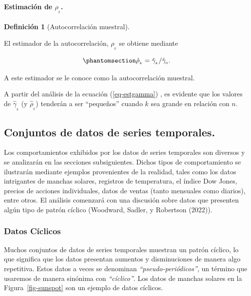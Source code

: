 \documentclass[
  us-letterpaper,
]{scrreprt}
\let\oldparagraph\paragraph
\renewcommand{\paragraph}[1]{\oldparagraph{#1}\mbox{}}
\theoremstyle{plain}
\theoremstyle{definition}
\newtheorem{definition}{Definición}[chapter]
\theoremstyle{definition}
\theoremstyle{plain}
\theoremstyle{remark}
\begin{document}
\paragraph{\texorpdfstring{Estimación de
\(\rho_{_k}\).}{Estimación de \textbackslash rho\_\{\_k\}.}}\label{estimaciuxf3n-de-rho__k.}

\begin{definition}[Autocorrelación
muestral]\protect\hypertarget{def-samplecorr}{}\label{def-samplecorr}

El estimador de la autocorrelación, \(\rho_{_{k}}\) se obtiene mediante

\begin{equation}\phantomsection\label{eq-sampleautocor}{
\hat\rho_{_{k}}=\hat\gamma_{_{k}}/\hat\gamma_{_{0}}.
}\end{equation}

A este estimador se le conoce como la autocorrelación muestral.

\end{definition}

A partir del análisis de la ecuación (\ref{eq-estgamma}) , es evidente
que los valores de \(\hat\gamma_{_{k}}\) (y \(\hat\rho_{_{k}}\))
tenderán a ser ``pequeños'' cuando \(k\) sea grande en relación con
\(n\).

\subsection{Conjuntos de datos de series
temporales.}\label{conjuntos-de-datos-de-series-temporales.}

Los comportamientos exhibidos por los datos de series temporales son
diversos y se analizarán en las secciones subsiguientes. Dichos tipos de
comportamiento se ilustrarán mediante ejemplos provenientes de la
realidad, tales como los datos intrigantes de manchas solares, registros
de temperatura, el índice Dow Jones, precios de acciones individuales,
datos de ventas (tanto mensuales como diarios), entre otros. El análisis
comenzará con una discusión sobre datos que presenten algún tipo de
patrón cíclico (Woodward, Sadler, y Robertson (2022)).

\subsubsection{Datos Cíclicos}\label{datos-cuxedclicos}

Muchos conjuntos de datos de series temporales muestran un patrón
cíclico, lo que significa que los datos presentan aumentos y
disminuciones de manera algo repetitiva. Estos datos a veces se
denominan \emph{``pseudo-periódicos''}, un término que usaremos de
manera sinónima con \emph{``cíclico''}. Los datos de manchas solares en
la Figura~\ref{fig-sunspot} son un ejemplo de datos cíclicos.
\end{document}
